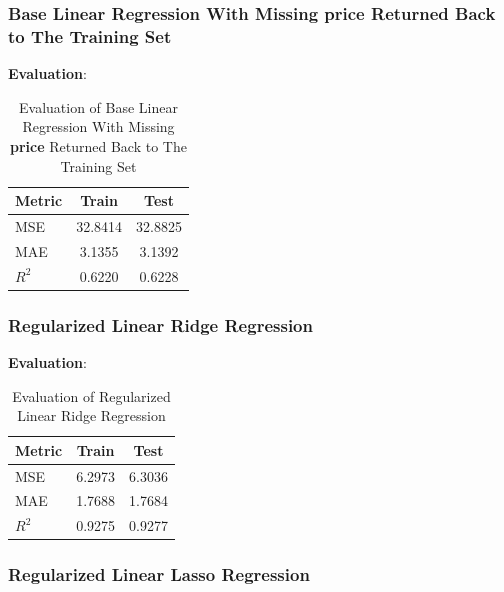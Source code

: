 \documentclass[a4paper,12pt]{article}
\begin{document}
\subsubsection*{Base Linear Regression With Missing \textbf{price} Returned Back to The Training Set}

\textbf{Evaluation}: 
\begin{table}[H]
    \centering
    \begin{tabular}{|l|c|c|}
    \hline
    \textbf{Metric} & \textbf{Train} & \textbf{Test} \\
    \hline
    MSE & 32.8414 & 32.8825 \\
    MAE & 3.1355 & 3.1392 \\
    $R^2$ & 0.6220 & 0.6228 \\
    \hline
    \end{tabular}
    \caption{Evaluation of Base Linear Regression With Missing \textbf{price} Returned Back to The Training Set}
    \label{tab:tab_4}
\end{table}
    

\subsubsection*{Regularized Linear Ridge Regression}

\textbf{Evaluation}: 
\begin{table}[H]
    \centering
    \begin{tabular}{|l|c|c|}
    \hline
    \textbf{Metric} & \textbf{Train} & \textbf{Test} \\
    \hline
    MSE & 6.2973 & 6.3036 \\
    MAE & 1.7688 & 1.7684 \\
    $R^2$ & 0.9275 & 0.9277 \\
    \hline
    \end{tabular}
    \caption{Evaluation of Regularized Linear Ridge Regression}
    \label{tab:tab_5}
\end{table}    

\subsubsection*{Regularized Linear Lasso Regression}
\end{document}
